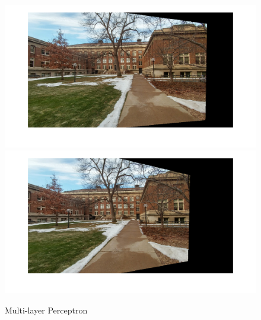 \documentclass[letter, 10pt]{article}
\begin{document}
\begin{figure}[H]
        \centering
        \includegraphics[width=\textwidth]{HW5/RESULT/im1_w.png}
    \endminipage\hfill
        \centering
        \includegraphics[width=1.1\textwidth]{HW5/RESULT/im2_w.png}
    \endminipage\hfill
    \caption{Multi-layer Perceptron}
\end{figure}
\end{document}
